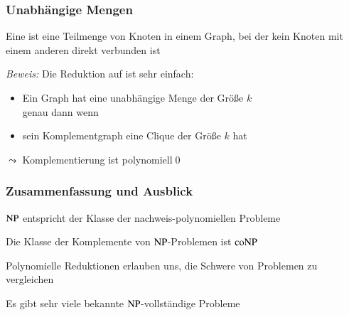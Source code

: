 \documentclass[onlymath]{beamer}
\begin{document}
\begin{frame}\frametitle{Unabhängige Mengen}

Eine  ist eine Teilmenge von Knoten in einem Graph, bei der kein
Knoten mit einem anderen direkt verbunden ist\medskip

\medskip\pause

\pause

\emph{Beweis:} Die Reduktion auf  ist sehr einfach:
\begin{itemize}
\item Ein Graph hat eine unabhängige Menge der Größe $k$\\
genau dann wenn
\item sein Komplementgraph eine Clique der Größe $k$ hat
\end{itemize}
$\leadsto$ Komplementierung ist polynomiell\qed

\end{frame}


\begin{frame}\frametitle{Zusammenfassung und Ausblick}

${\textsc{NP}}$ entspricht der Klasse der nachweis-polynomiellen Probleme
\bigskip

Die Klasse der Komplemente von ${\textsc{NP}}$-Problemen ist ${\textsc{coNP}}$\bigskip

Polynomielle Reduktionen erlauben uns, die Schwere von Problemen zu vergleichen
\bigskip

Es gibt sehr viele bekannte ${\textsc{NP}}$-vollständige Probleme\bigskip


\end{frame}

% 
% 
% 
% 
% 
% 
\end{document}
